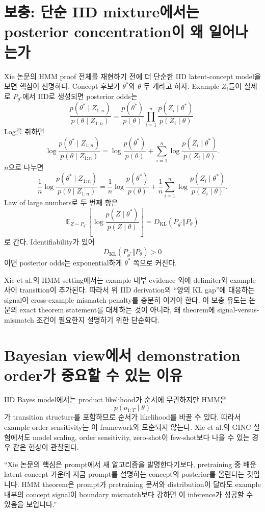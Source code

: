 \documentclass[11pt,a4paper,oneside,openany]{memoir}
\newcommand{\E}{\mathbb{E}}
\newcommand{\KL}{D_{\mathrm{KL}}}
\theoremstyle{definition}
\begin{document}
\section{보충: 단순 IID mixture에서는 posterior concentration이 왜 일어나는가}

Xie 논문의 HMM proof 전체를 재현하기 전에 더 단순한 IID latent-concept model을 보면 핵심이 선명하다.
Concept 후보가 $\theta^*$와 $\theta$ 두 개라고 하자.
Example $Z_i$들이 실제로 $P_{\theta^*}$에서 IID로 생성되면 posterior odds는
\[
\frac{p(\theta^*\mid Z_{1:n})}{p(\theta\mid Z_{1:n})}
=
\frac{p(\theta^*)}{p(\theta)}
\prod_{i=1}^n
\frac{p(Z_i\mid\theta^*)}{p(Z_i\mid\theta)}.
\]
Log를 취하면
\[
\log\frac{p(\theta^*\mid Z_{1:n})}{p(\theta\mid Z_{1:n})}
=
\log\frac{p(\theta^*)}{p(\theta)}
+
\sum_{i=1}^n
\log\frac{p(Z_i\mid\theta^*)}{p(Z_i\mid\theta)}.
\]
$n$으로 나누면
\[
\frac1n\log\frac{p(\theta^*\mid Z_{1:n})}{p(\theta\mid Z_{1:n})}
=
\frac1n\log\frac{p(\theta^*)}{p(\theta)}
+
\frac1n\sum_{i=1}^n
\log\frac{p(Z_i\mid\theta^*)}{p(Z_i\mid\theta)}.
\]
Law of large numbers로 두 번째 항은
\[
\E_{Z\sim P_{\theta^*}}
\left[
\log\frac{p(Z\mid\theta^*)}{p(Z\mid\theta)}
\right]
=
\KL(P_{\theta^*}\Vert P_\theta)
\]
로 간다.
Identifiability가 있어
\[
\KL(P_{\theta^*}\Vert P_\theta)>0
\]
이면 posterior odds는 exponential하게 $\theta^*$ 쪽으로 커진다.

\begin{suppbox}
Xie et al.의 HMM setting에서는 example 내부 evidence 외에 delimiter와 example 사이 transition이 추가된다. 따라서 위 IID derivation의 ``양의 KL gap''에 대응하는 signal이 cross-example mismatch penalty를 충분히 이겨야 한다. 이 보충 유도는 논문의 exact theorem statement를 대체하는 것이 아니라, 왜 theorem에 signal-versus-mismatch 조건이 필요한지 설명하기 위한 단순화다.
\end{suppbox}

\section{Bayesian view에서 demonstration order가 중요할 수 있는 이유}

IID Bayes model에서는 product likelihood가 순서에 무관하지만 HMM은
\[
p(o_{1:T}\mid\theta)
\]
가 transition structure를 포함하므로 순서가 likelihood를 바꿀 수 있다.
따라서 example order sensitivity는 이 framework와 모순되지 않는다.
Xie et al.의 GINC 실험에서도 model scaling, order sensitivity, zero-shot이 few-shot보다 나을 수 있는 경우 같은 현상이 관찰된다.

\begin{presentbox}
``Xie 논문의 핵심은 prompt에서 새 알고리즘을 발명한다기보다, pretraining 중 배운 latent concept 가운데 지금 prompt를 설명하는 concept의 posterior를 올린다는 것입니다. HMM theorem은 prompt가 pretraining 문서와 distribution이 달라도 example 내부의 concept signal이 boundary mismatch보다 강하면 이 inference가 성공할 수 있음을 보입니다.''
\end{presentbox}
\end{document}
